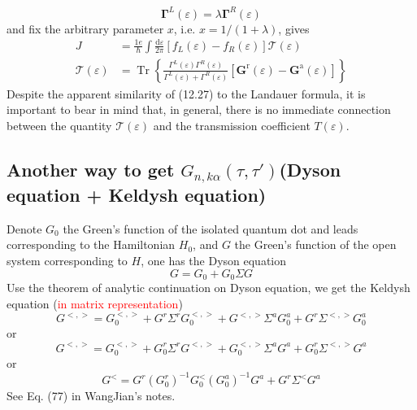 \documentclass[11pt,a4paper]{article}
\begin{document}
\begin{equation}
\boldsymbol{\Gamma}^{L}(\varepsilon)=\lambda \boldsymbol{\Gamma}^{R}(\varepsilon)
\end{equation}
and fix the arbitrary parameter $x$, i.e. $x=1 /(1+\lambda)$, gives
\begin{equation}
\begin{aligned}
J &=\frac{1 e}{\hbar} \int \frac{\mathrm{d} \varepsilon}{2 \pi}\left[f_{L}(\varepsilon)-f_{R}(\varepsilon)\right] \mathcal{T}(\varepsilon) \\
\mathcal{T}(\varepsilon) &=\operatorname{Tr}\left\{\frac{\Gamma^{L}(\varepsilon) \Gamma^{R}(\varepsilon)}{\Gamma^{L}(\varepsilon)+\Gamma^{R}(\varepsilon)}\left[\mathbf{G}^{\mathrm{r}}(\varepsilon)-\mathbf{G}^{\mathrm{a}}(\varepsilon)\right]\right\}
\end{aligned}
\end{equation}
Despite the apparent similarity of (12.27) to the Landauer formula, it is important to bear in mind that, in general, there is no immediate connection between the quantity $\mathcal{T}(\varepsilon)$ and the transmission coefficient $T(\varepsilon)$.
\subsection{Another way to get $G_{n,k\alpha}(\tau,\tau')$(Dyson equation + Keldysh equation)}
Denote $G_{0}$ the Green’s function of the isolated quantum dot and leads corresponding to the Hamiltonian $H_{0}$, and $G$ the Green’s function of the open system corresponding to $H$, one has the Dyson equation
\begin{equation}
G=G_{0}+G_{0} \Sigma G
\end{equation}
Use the theorem of analytic continuation on Dyson equation, we get the Keldysh equation (\textcolor{red}{in matrix representation})
\begin{equation}
G^{<,>}=G_{0}^{<,>}+G^{r} \Sigma^{r} G_{0}^{<,>}+G^{<,>} \Sigma^{a} G_{0}^{a}+G^{r} \Sigma^{<,>} G_{0}^{a}
\end{equation}
or
\begin{equation}
G^{<,>}=G_{0}^{<,>}+G_{0}^{r} \Sigma^{r} G^{<,>}+G_{0}^{<,>} \Sigma^{a} G^{a}+G_{0}^{r} \Sigma^{<,>} G^{a}
\end{equation}
or
\begin{equation}
G^{<}=G^{r}\left(G_{0}^{r}\right)^{-1} G_{0}^{<}\left(G_{0}^{a}\right)^{-1} G^{a}+G^{r} \Sigma^{<} G^{a}
\end{equation}
See Eq. (77) in WangJian's notes.
\end{document}
